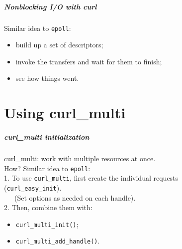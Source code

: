 \documentclass[aspectratio=43]{beamer}
\newenvironment{changemargin}[1]{%
  \begin{list}{}{%
    \setlength{\topsep}{0pt}%
    \setlength{\leftmargin}{#1}%
    \setlength{\rightmargin}{1em}
    \setlength{\listparindent}{\parindent}%
    \setlength{\itemindent}{\parindent}%
    \setlength{\parsep}{\parskip}%
  }%
  \item[]}{\end{list}}
\begin{document}
\begin{frame}
  \frametitle{Nonblocking I/O with curl}
  \begin{changemargin}{2em}
    Similar idea to {\tt epoll}:
\begin{itemize}
\item build up a set of descriptors;
\item invoke the transfers and wait for them to finish;
\item see how things went.
\end{itemize}
  \end{changemargin}
\end{frame}

\part{Using curl\_multi}
\frame{\partpage}

\begin{frame}
  \frametitle{curl\_multi initialization}

  \begin{changemargin}{2cm}
    curl\_multi: work with multiple resources at once.\\[1em]

    How? Similar idea to {\tt epoll}:\\[1em]

    1. To use {\tt curl\_multi}, first create the individual requests \\ \hspace{2em} ({\tt curl\_easy\_init}).\\
    ~~~(Set options as needed on each handle).\\[1em]

    2. Then, combine them with:
    \begin{itemize}
      \item {\tt curl\_multi\_init()};
      \item {\tt curl\_multi\_add\_handle()}.
    \end{itemize}

  \end{changemargin}

\end{frame}
\end{document}

